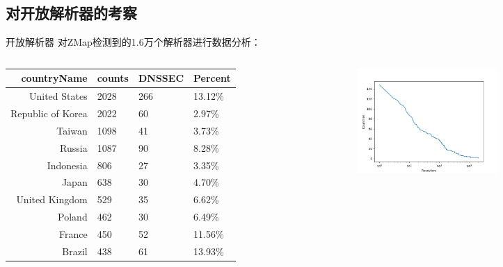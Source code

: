 \documentclass{beamer}
\begin{document}
  \subsection{对开放解析器的考察}
  \begin{frame}{开放解析器}
    对ZMap检测到的1.6万个解析器进行数据分析：
    \begin{columns}
      
      \begin{column}{0.5\textwidth}
        \begin{table}
          \tiny
          \begin{tabular}{r l l l}
            \toprule
            countryName &counts & DNSSEC & Percent\\
            \midrule
                 
            United States &	2028 &266&13.12\%\\
            Republic of Korea &	2022&60&2.97\%\\
            Taiwan &	1098&41&3.73\%\\
            Russia &	1087&90&8.28\%\\
            Indonesia &	806&27&3.35\%\\
            Japan &	638&30&4.70\%\\
            United Kingdom &	529&35&6.62\%\\
            Poland &	462&30&6.49\%\\
            France &	450&52&11.56\%\\
            Brazil &	438& 61&13.93\%\\
            \bottomrule
            \end{tabular}
        \end{table}
    
      \end{column}
      \begin{column}{0.5\textwidth}
        \begin{figure}
          \centering
          \includegraphics[height=4cm]{figures/resolvercy.png}
          \label{fig:resolvercy}
        \end{figure}
      \end{column}
      \end{columns}
  
  \end{frame}
\end{document}
